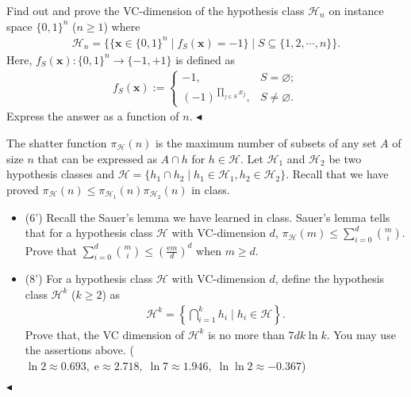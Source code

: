 \documentclass[11pt]{article}
\newenvironment{problem}[2][Problem]{\begin{trivlist}
\item[\hskip \labelsep {\bfseries #1}\hskip \labelsep {\bfseries #2.}]}{\hfill$\blacktriangleleft$\end{trivlist}}
\begin{document}
\begin{problem}{5 (16')}
Find out and prove the VC-dimension of the hypothesis class $\mathcal{H}_n$ on instance space $\{0,1\}^n$ ($n\geq 1$) where
\begin{align*}
    \mathcal{H}_n=\{\{\bm x\in \{0,1\}^n \mid f_S(\bm x)=-1\}\mid S\subseteq \{1,2,\cdots,n\}\}.
\end{align*}
Here, $f_S(\bm x): \{0,1\}^n\to\{-1,+1\}$ is defined as
\begin{align*}
    f_S(\bm x) := \begin{cases}
        -1,  & S = \varnothing; \\ 
        (-1)^{\prod_{j\in S}x_j}, &  S \ne \varnothing.
    \end{cases}
\end{align*}
Express the answer as a function of $n$.
\end{problem}


\begin{problem}{6 (14')} The shatter function $\pi_\mathcal{H}(n)$ is the maximum number of subsets of any set $A$ of size $n$ that can be expressed as $A\cap h$ for $h\in \mathcal{H}$. Let $\mathcal{H}_1$ and $\mathcal{H}_2$ be two hypothesis classes and $\mathcal{H}=\{h_1\cap h_2\mid h_1\in \mathcal{H}_1,h_2\in \mathcal{H}_2\}$. Recall that we have proved $\pi_\mathcal{H}(n)\leq\pi_{\mathcal{H}_1}(n)\pi_{\mathcal{H}_2}(n)$ in class. 

\begin{itemize}
    \item [(1)] (6') Recall the Sauer's lemma we have learned in class. Sauer's lemma tells that for a hypothesis class $\mathcal{H}$ with VC-dimension $d$, $\pi_\mathcal{H}(m)\leq\sum_{i=0}^d\binom{m}{i}$. Prove that $\sum_{i=0}^d\binom{m}{i}\leq\left(\frac{\mathrm{e}m}{d}\right)^d$ when $m\geq d$.
    \item [(2)] (8') For a hypothesis class $\mathcal{H}$ with VC-dimension $d$, define the hypothesis class $\mathcal{H}^k$ ($k\geq 2$) as
    \begin{align*}
        \mathcal{H}^k=\left\{\bigcap_{i=1}^k h_i\;\big|\; h_i\in \mathcal{H}\right\}.
    \end{align*}
    Prove that, the VC dimension of $\mathcal{H}^k$ is no more than $7dk\ln k$. You may use the assertions above. ($\ln 2\approx0.693,\;\mathrm{e}\approx2.718,\;\ln 7\approx 1.946,\;\ln\ln 2\approx-0.367$)
\end{itemize}
\end{problem}
\end{document}
